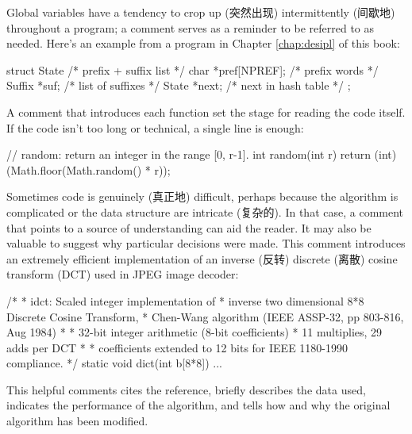 Global variables have a tendency to crop up (突然出现) intermittently
(间歇地) throughout a program; a comment serves as a reminder to be
referred to as needed. Here's an example from a program in Chapter
\ref{chap:desipl} of this book:
\begin{wellcode}
    struct State { /* prefix + suffix list */
        char    *pref[NPREF];   /* prefix words */
        Suffix  *suf;           /* list of suffixes */
        State   *next;          /* next in hash table */
    };
\end{wellcode}
A comment that introduces each function set the stage for reading the code
itself. If the code isn't too long or technical, a single line is enough:
\begin{wellcode}
    // random: return an integer in the range [0, r-1].
    int random(int r)
    {
        return (int)(Math.floor(Math.random() * r));
    }
\end{wellcode}
Sometimes code is genuinely (真正地) difficult, perhaps because the
algorithm is complicated or the data structure are intricate (复杂的). In
that case, a comment that points to a source of understanding can aid the
reader. It may also be valuable to suggest why particular decisions were
made. This comment introduces an extremely efficient implementation of an
inverse (反转) discrete (离散) cosine transform (DCT) used in JPEG image
decoder:
\begin{wellcode}
    /*
     * idct: Scaled integer implementation of 
     * inverse two dimensional 8*8 Discrete Cosine Transform,
     * Chen-Wang algorithm (IEEE ASSP-32, pp 803-816, Aug 1984)
     *
     * 32-bit integer arithmetic (8-bit coefficients)
     * 11 multiplies, 29 adds per DCT
     *
     * coefficients extended to 12 bits for IEEE 1180-1990 compliance.
     */
     static void dict(int b[8*8])
     {
         ...
     }
\end{wellcode}
This helpful comments cites the reference, briefly describes the data used,
indicates the performance of the algorithm, and tells how and why the
original algorithm has been modified.

